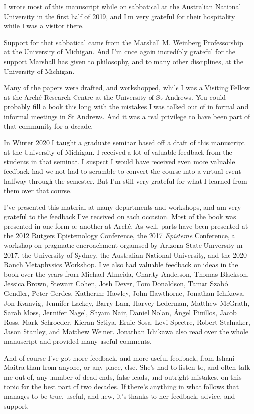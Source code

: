 \documentclass[
  10pt,
  letterpaper,
  twoside]{scrbook}
\begin{document}
I wrote most of this manuscript while on sabbatical at the Australian
National University in the first half of 2019, and I'm very grateful for
their hospitality while I was a visitor there.

Support for that sabbatical came from the Marshall M. Weinberg
Professorship at the University of Michigan. And I'm once again
incredibly grateful for the support Marshall has given to philosophy,
and to many other disciplines, at the University of Michigan.

Many of the papers were drafted, and workshopped, while I was a Visiting
Fellow at the Arché Research Centre at the University of St Andrews. You
could probably fill a book this long with the mistakes I was talked out
of in formal and informal meetings in St Andrews. And it was a real
privilege to have been part of that community for a decade.

In Winter 2020 I taught a graduate seminar based off a draft of this
manuscript at the University of Michigan. I received a lot of valuable
feedback from the students in that seminar. I suspect I would have
received even more valuable feedback had we not had to scramble to
convert the course into a virtual event halfway through the semester.
But I'm still very grateful for what I learned from them over that
course.

I've presented this material at many departments and workshops, and am
very grateful to the feedback I've received on each occasion. Most of
the book was presented in one form or another at Arché. As well, parts
have been presented at the 2012 Rutgers Epistemology Conference, the
2017 \emph{Episteme} Conference, a workshop on pragmatic encroachment
organised by Arizona State University in 2017, the University of Sydney,
the Australian National University, and the 2020 Ranch Metaphysics
Workshop. I've also had valuable feedback on ideas in the book over the
years from Michael Almeida, Charity Anderson, Thomas Blackson, Jessica
Brown, Stewart Cohen, Josh Dever, Tom Donaldson, Tamar Szabó Gendler,
Peter Gerdes, Katherine Hawley, John Hawthorne, Jonathan Ichikawa, Jon
Kvanvig, Jennifer Lackey, Barry Lam, Harvey Lederman, Matthew McGrath,
Sarah Moss, Jennifer Nagel, Shyam Nair, Daniel Nolan, Ángel Pinillos,
Jacob Ross, Mark Schroeder, Kieran Setiya, Ernie Sosa, Levi Spectre,
Robert Stalnaker, Jason Stanley, and Matthew Weiner. Jonathan Ichikawa
also read over the whole manuscript and provided many useful comments.

And of course I've got more feedback, and more useful feedback, from
Ishani Maitra than from anyone, or any place, else. She's had to listen
to, and often talk me out of, any number of dead ends, false leads, and
outright mistakes, on this topic for the best part of two decades. If
there's anything in what follows that manages to be true, useful, and
new, it's thanks to her feedback, advice, and support.
\end{document}
